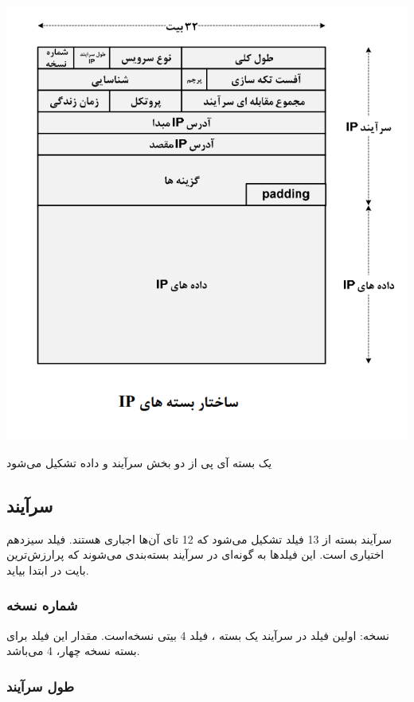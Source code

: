 \documentclass[12pt]{book}
\begin{document}
\begin{center}
	\includegraphics[scale=0.6]{./ip_1.png}
\end{center}


یک بسته آی پی از دو بخش سرآیند
 و داده تشکیل می‌شود
 
\subsection{سرآیند }

سرآیند بسته 
 از 13 فیلد تشکیل می‌شود که 12 تای آن‌ها اجباری هستند. فیلد سیزدهم اختیاری است. این فیلدها به گونه‌ای در سرآیند بسته‌بندی می‌شوند که پرارزش‌ترین بایت در ابتدا بیاید. 

\subsubsection{شماره نسخه}
نسخه: اولین فیلد در سرآیند یک بسته 
 ، فیلد 4 بیتی نسخه‌است. مقدار این فیلد برای بسته 
نسخه چهار، 4 می‌باشد.


\subsubsection{طول سرآیند}
\end{document}
